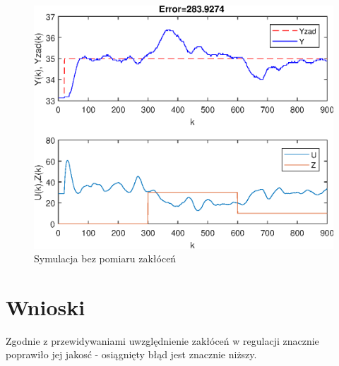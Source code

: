 \begin{figure}[h!]
	\centering
	\includegraphics[scale=1]{Rys/LAB2_DMC_ZAK_OFF_N=120Nu=20lambda=0.1error=283.9274tau=1.eps}
	\caption{Symulacja bez pomiaru zakłóceń}
	\label{bez}
\end{figure}

\section {Wnioski}

Zgodnie z przewidywaniami uwzględnienie zakłóceń w regulacji znacznie poprawiło jej jakosć - osiągnięty błąd jest znacznie niższy. 